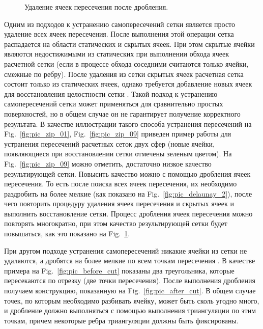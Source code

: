 \documentclass[
11pt,%
tightenlines,%
twoside,%
onecolumn,%
nofloats,%
nobibnotes,%
nofootinbib,%
superscriptaddress,%
noshowpacs,%
centertags]%
{revtex4}
\begin{document}
\begin{figure}[h]
\begin{minipage}[h]{0.32\textwidth}
    \caption{Удаление ячеек пересечения после дробления.}\label{fig:pic_zip_15}
  \end{minipage}
\end{figure}

Одним из подходов к устранению самопересечений сетки является просто удаление всех ячеек пересечения.
После выполнения этой операции сетка распадается на области статических и скрытых ячеек.
При этом скрытые ячейки являются недостижимыми из статических при выполнении обхода ячеек расчетной сетки (если в процессе обхода соседними считаются только ячейки, смежные по ребру).
После удаления из сетки скрытых ячеек расчетная сетка состоит только из статических ячеек, однако требуется добавление новых ячеек для восстановления целостности сетки \cite{Charton}.
Такой подход к устранению самопересечений сетки может применяться для сравнительно простых поверхностей, но в общем случае он не гарантирует получение корректного результата.
В качестве иллюстрации такого способа устранения пересечений на Fig.~\ref{fig:pic_zip_01}, Fig.~\ref{fig:pic_zip_09} приведен пример работы для устранения пересечений расчетных сеток двух сфер (новые ячейки, появляющиеся при восстановлении сетки отмечены зеленым цветом).
На Fig.~\ref{fig:pic_zip_09} можно отметить, достаточно низкое качество результирующей сетки.
Повысить качество можно с помощью дробления ячеек пересечения.
То есть после поиска всех ячеек пересечения, их необходимо раздробить на более мелкие (как показано на Fig.~\ref{fig:pic_delaunay_2}), после чего повторить процедуру удаления ячеек пересечения и скрытых ячеек и выполнить восстановление сетки.
Процесс дробления ячеек пересечения можно повторять многократно, при этом качество результирующей сетки будет повышаться, как это показано на Fig.~\ref{fig:pic_zip_15}.

При другом подходе устранения самопересечений никакие ячейки из сетки не удаляются, а дробятся на более мелкие по всем точкам пересечения \cite{Skvorkovska}.
В качестве примера на Fig.~\ref{fig:pic_before_cut} показаны два треугольника, которые пересекаются по отрезку (две точки пересечения).
После выполнения дробления получаем конструкцию, показанную на Fig.~\ref{fig:pic_after_cut}.
В общем случае точек, по которым необходимо разбивать ячейку, может быть сколь угодно много, и дробление должно выполняться с помощью выполнения триангуляции по этим точкам, причем некоторые ребра триангуляции должны быть фиксированы.
\end{document}

